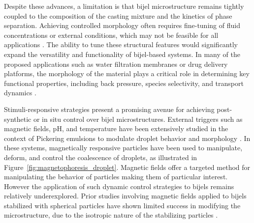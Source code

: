 
Despite these advances, a limitation is that bijel microstructure remains tightly coupled to the composition of the casting mixture and the kinetics of phase separation. Achieving controlled 
morphology often requires fine-tuning of fluid concentrations or external conditions, which may not be feasible for all applications \cite{haase_continuous_2015, reeves_particle-size_2015}.
The ability to tune these structural features would significantly expand the versatility and functionality of bijel-based systems.
In many of the proposed applications such as water filtration membranes or drug delivery 
platforms, the morphology of the material plays a critical role in determining key functional properties, including back pressure, species selectivity, and transport dynamics
\cite{vanoli_bijels_2022, thorson_bijel-templated_2019, khan_nanostructured_2022}.

Stimuli-responsive strategies present a promising avenue for achieving post-synthetic or in situ control over bijel microstructures. External triggers such as magnetic fields, pH, and temperature have 
been extensively studied in the context of Pickering emulsions to modulate droplet behavior and morphology \cite{tham_magnetophoresis_2021, cui_stabilizing_2013}. In these systems, magnetically 
responsive particles have been used to manipulate, deform, and control the coalescence of droplets, as illustrated in Figure~\ref{fig:magnetophoresis_droplet}. Magnetic 
fields offer a targeted method for manipulating the behavior of particles making them of particular interest. 
However the application of such dynamic control strategies to bijels remains relatively underexplored. Prior studies involving magnetic fields applied to bijels stabilized with spherical particles 
have shown limited success in modifying the microstructure, due to the isotropic nature of the stabilizing particles \cite{kim_bijels_2010}. 

